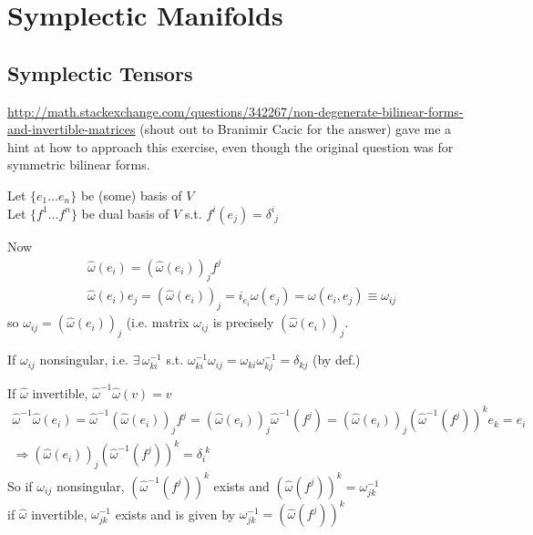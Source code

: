 \section{Symplectic Manifolds}


\subsection{Symplectic Tensors}


{\scriptsize{\url{http://math.stackexchange.com/questions/342267/non-degenerate-bilinear-forms-and-invertible-matrices}}} (shout out to Branimir Cacic for the answer)  gave me a hint at how to approach this exercise, even though the original question was for symmetric bilinear forms.  

Let $\lbrace e_1 \dots e_n \rbrace$ be (some) basis of $V$ \\
Let $\lbrace f^1 \dots f^n \rbrace$ be dual basis of $V$ s.t. $f^i(e_j)=\delta^i_{ \,\, j}$

Now
\[
\begin{aligned}
  & \widehat{\omega}(e_i) = (\widehat{\omega}(e_i))_jf^j \\
  & \widehat{\omega}(e_i)e_j = (\widehat{\omega}(e_i))_j = i_{e_i}\omega(e_j) = \omega(e_i,e_j) \equiv \omega_{ij}
\end{aligned}
\]
so $\omega_{ij} = (\widehat{\omega}(e_i))_j$ (i.e. matrix $\omega_{ij}$ is precisely $(\widehat{\omega}(e_i))_j$.  

If $\omega_{ij}$ nonsingular, i.e. $\exists \, \omega^{-1}_{ki}$ s.t. $\omega^{-1}_{ki} \omega_{ij} = \omega_{ki}\omega^{-1}_{kj} = \delta_{kj}$ (by def.)

If $\widehat{\omega}$ invertible, $\widehat{\omega}^{-1} \widehat{\omega}(v) = v$
\[
\begin{gathered}
  \widehat{\omega}^{-1}\widehat{\omega}(e_i) = \widehat{\omega}^{-1}(\widehat{\omega}(e_i))_j f^j = (\widehat{\omega}(e_i))_j \widehat{\omega}^{-1}(f^j) = (\widehat{\omega}(e_i))_j(\widehat{\omega}^{-1}(f^j))^k e_k = e_i \\
\Longrightarrow (\widehat{\omega}(e_i))_j(\widehat{\omega}^{-1}(f^j))^k = \delta_i^{ \, \, k}
\end{gathered}
\]
So if $\omega_{ij}$ nonsingular, $(\widehat{\omega}^{-1}(f^j))^k$ exists and $(\widehat{\omega}(f^j))^k = \omega^{-1}_{jk}$ \\
\phantom{So } if $\widehat{\omega}$ invertible, $\omega^{-1}_{jk}$ exists and is given by $\omega^{-1}_{jk} = (\widehat{\omega}(f^j))^k$


